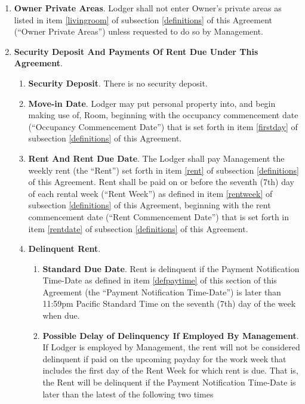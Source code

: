 \documentclass[12pt,letterpaper]{article}
\newcommand{\lodger}{Lodger}
\newcommand{\management}{Management}
\newcommand{\room}{Room}
\newcommand{\furniture}{Furniture, Kitchenware, Linen, etc.}
\newcommand{\livingroom}{Owner Private Areas}
\newcommand{\firstday}{Occupancy Commencement Date}
\newcommand{\rentdate}{Rent Commencement Date}
\newcommand{\rentweek}{Rent Week}
\newcommand{\paymenttime}{Payment Notification Time-Date}
\begin{document}
\begin{enumerate}
\begin{enumerate}
			\item \textbf{\furniture{}}. \management{} shall provide the \furniture{} listed in item \ref{furniture} of subsection \ref{definitions} of this Agreement{} (``\furniture{}'') in usable condition and maintain same in usable condition during the time \room{} is rented to \lodger{}.
		\end{enumerate}
	\item \textbf{\livingroom{}}. \lodger{} shall not enter Owner's private areas as listed in item \ref{livingroom} of subsection \ref{definitions} of this Agreement (``\livingroom{}'') unless requested to do so by \management{}.
	\item \textbf{Security Deposit And Payments Of Rent Due Under This Agreement}. 
		\begin{enumerate}
			\item \textbf{Security Deposit}. There is no security deposit. 
			\item \textbf{Move-in Date}. \lodger{} may put personal property into, and begin making use of, \room{}, beginning with the occupancy commencement date (``\firstday{}'') that is set forth in item \ref{firstday} of subsection \ref{definitions} of this Agreement.
			\item \textbf{Rent And Rent Due Date}. The \lodger{} shall pay \management{} the weekly rent (the ``Rent'') set forth in item \ref{rent} of subsection \ref{definitions} of this Agreement{}. Rent shall be paid on or before the seventh (7th) day of each rental week (``\rentweek{}'') as defined in item \ref{rentweek} of subsection \ref{definitions} of this Agreement, beginning with the rent commencement date (``\rentdate{}'') that is set forth in item \ref{rentdate} of subsection \ref{definitions} of this Agreement.
			\item \textbf{Delinquent Rent}. \label{due}
				\begin{enumerate}
					\item \textbf{Standard Due Date}. Rent is delinquent if the \paymenttime{} as defined in item \ref{defpaytime} of this section of this Agreement (the ``\paymenttime{}'') is later than 11:59pm Pacific Standard Time on the seventh (7th) day of the week when due. 
					\item \textbf{Possible Delay of Delinquency If Employed By Management}. If \lodger{} is employed by \management{}, the rent will not be considered delinquent if paid on the upcoming payday for the work week that includes the first day of the \rentweek{} for which rent is due. That is, the Rent will be delinquent if the \paymenttime{} is later than the latest of the following two times 

\end{enumerate}
\end{enumerate}
\end{enumerate}
\end{document}
